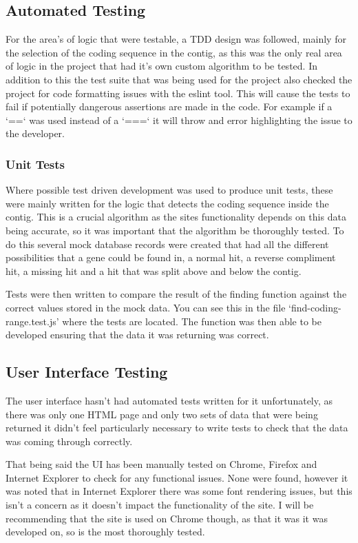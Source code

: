 \subsection{Automated Testing}
For the area's of logic that were testable, a TDD design was followed, mainly for the selection of the coding sequence in the contig, as this was the only real area of logic in the project that had it's own custom algorithm to be tested. In addition to this the test suite that was being used for the project also checked the project for code formatting issues with the eslint\cite{eslint} tool. This will cause the tests to fail if potentially dangerous assertions are made in the code. For example if a `==` was used instead of a `===` it will throw and error highlighting the issue to the developer. 

\subsubsection{Unit Tests}
Where possible test driven development was used to produce unit tests, these were mainly written for the logic that detects the coding sequence inside the contig. This is a crucial algorithm as the sites functionality depends on this data being accurate, so it was important that the algorithm be thoroughly tested. To do this several mock database records were created that had all the different possibilities that a gene could be found in, a normal hit, a reverse compliment hit, a missing hit and a hit that was split above and below the contig. 

Tests were then written to compare the result of the finding function against the correct values stored in the mock data. You can see this in the file `find-coding-range.test.js' where the tests are located. The function was then able to be developed ensuring that the data it was returning was correct. 

\subsection{User Interface Testing}
The user interface hasn't had automated tests written for it unfortunately, as there was only one HTML page and only two sets of data that were being returned it didn't feel particularly necessary to write tests to check that the data was coming through correctly. 

That being said the UI has been manually tested on Chrome, Firefox and Internet Explorer to check for any functional issues. None were found, however it was noted that in Internet Explorer there was some font rendering issues, but this isn't a concern as it doesn't impact the functionality of the site. I will be recommending that the site is used on Chrome though, as that it was it was developed on, so is the most thoroughly tested. 

